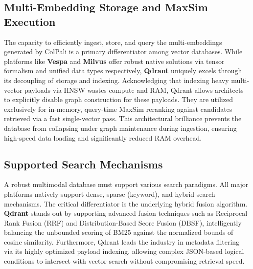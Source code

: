 \subsection{Multi-Embedding Storage and MaxSim Execution}
The capacity to efficiently ingest, store, and query the multi-embeddings generated by ColPali is a primary differentiator among vector databases. While platforms like \textbf{Vespa} and \textbf{Milvus} offer robust native solutions via tensor formalism and unified data types respectively, \textbf{Qdrant} uniquely excels through its decoupling of storage and indexing. Acknowledging that indexing heavy multi-vector payloads via HNSW wastes compute and RAM, Qdrant allows architects to explicitly disable graph construction for these payloads. They are utilized exclusively for in-memory, query-time MaxSim reranking against candidates retrieved via a fast single-vector pass. This architectural brilliance prevents the database from collapsing under graph maintenance during ingestion, ensuring high-speed data loading and significantly reduced RAM overhead.

\begin{table}[H]
    \centering
    \caption{Multi-Vector Storage and MaxSim Implementation}
    \label{tab:multivector_impl}
\end{table}

\subsection{Supported Search Mechanisms}
A robust multimodal database must support various search paradigms. All major platforms natively support dense, sparse (keyword), and hybrid search mechanisms. The critical differentiator is the underlying hybrid fusion algorithm. \textbf{Qdrant} stands out by supporting advanced fusion techniques such as Reciprocal Rank Fusion (RRF) and Distribution-Based Score Fusion (DBSF), intelligently balancing the unbounded scoring of BM25 against the normalized bounds of cosine similarity. Furthermore, Qdrant leads the industry in metadata filtering via its highly optimized payload indexing, allowing complex JSON-based logical conditions to intersect with vector search without compromising retrieval speed.

